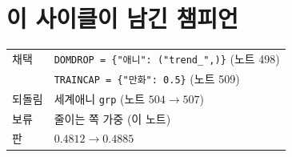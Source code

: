 \documentclass[11pt]{article}
\begin{document}
\section*{이 사이클이 남긴 챔피언}

\begin{center}
\begin{tabular}{ll}
\hline
채택 & \texttt{DOMDROP = \{"애니": ("trend\_",)\}} (노트 498) \\
& \texttt{TRAINCAP = \{"만화": 0.5\}} (노트 509) \\
되돌림 & 세계애니 \texttt{grp} (노트 $504 \to 507$) \\
보류 & 줄이는 쪽 가중 (이 노트) \\
\hline
판 & $0.4812 \to \mathbf{0.4885}$ \\
\hline
\end{tabular}
\end{center}
\end{document}
